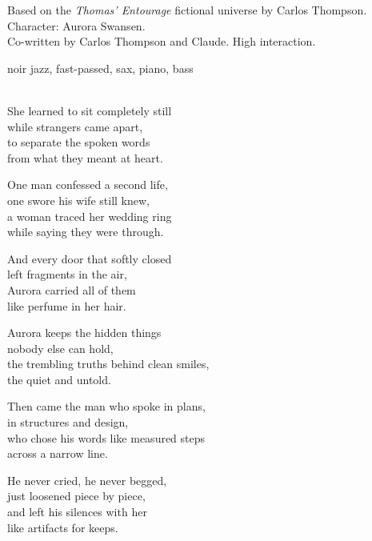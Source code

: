 

\begin{notes}
Based on the \emph{Thomas’ Entourage} fictional universe by Carlos Thompson.\\
Character: Aurora Swansen.\\
Co-written by Carlos Thompson and Claude. %
High interaction.
\end{notes}

\begin{style}
noir jazz, fast-passed, sax, piano, bass
\end{style}

\begin{lyrics}

\\
She learned to sit completely still\\
while strangers came apart,\\
to separate the spoken words\\
from what they meant at heart.

One man confessed a second life,\\
one swore his wife still knew,\\
a woman traced her wedding ring\\
while saying they were through.

And every door that softly closed\\
left fragments in the air,\\
Aurora carried all of them\\
like perfume in her hair.

Aurora keeps the hidden things\\
nobody else can hold,\\
the trembling truths behind clean smiles,\\
the quiet and untold.

Then came the man who spoke in plans,\\
in structures and design,\\
who chose his words like measured steps\\
across a narrow line.

He never cried, he never begged,\\
just loosened piece by piece,\\
and left his silences with her\\
like artifacts for keeps.


\end{lyrics}
